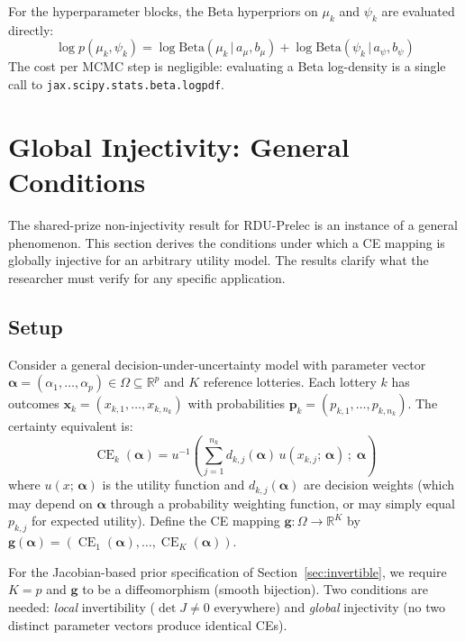 \documentclass[11pt,a4paper]{article}
\theoremstyle{definition}
\newcommand{\given}{\,|\,}
\DeclareMathOperator{\CE}{CE}
\begin{document}
For the hyperparameter blocks, the Beta hyperpriors on $\mu_k$ and $\psi_k$
are evaluated directly:
\begin{equation}
    \log p(\mu_k, \psi_k) = \log \mathrm{Beta}(\mu_k \given a_\mu, b_\mu)
    + \log \mathrm{Beta}(\psi_k \given a_\psi, b_\psi)
\end{equation}
The cost per MCMC step is negligible: evaluating a Beta log-density is a single
call to \texttt{jax.scipy.stats.beta.logpdf}.


\section{Global Injectivity: General Conditions}
\label{sec:general_injectivity}

The shared-prize non-injectivity result for RDU-Prelec is an instance of a
general phenomenon. This section derives the conditions under which a CE
mapping is globally injective for an arbitrary utility model. The results
clarify what the researcher must verify for any specific application.

\subsection{Setup}

Consider a general decision-under-uncertainty model with parameter vector
$\bm{\alpha} = (\alpha_1, \ldots, \alpha_p) \in \Omega \subseteq \mathbb{R}^p$
and $K$ reference lotteries. Each lottery $k$ has outcomes
$\mathbf{x}_k = (x_{k,1}, \ldots, x_{k,n_k})$ with probabilities
$\mathbf{p}_k = (p_{k,1}, \ldots, p_{k,n_k})$. The certainty equivalent is:
\begin{equation}
    \label{eq:general_ce}
    \CE_k(\bm{\alpha}) = u^{-1}\!\left(
    \sum_{j=1}^{n_k} d_{k,j}(\bm{\alpha}) \, u(x_{k,j};\, \bm{\alpha})
    \,;\; \bm{\alpha}\right)
\end{equation}
where $u(x;\, \bm{\alpha})$ is the utility function and
$d_{k,j}(\bm{\alpha})$ are decision weights (which may depend on
$\bm{\alpha}$ through a probability weighting function, or may simply equal
$p_{k,j}$ for expected utility). Define the CE mapping
$\mathbf{g}: \Omega \to \mathbb{R}^K$ by
$\mathbf{g}(\bm{\alpha}) = (\CE_1(\bm{\alpha}), \ldots, \CE_K(\bm{\alpha}))$.

For the Jacobian-based prior specification of Section~\ref{sec:invertible}, we
require $K = p$ and $\mathbf{g}$ to be a diffeomorphism (smooth bijection).
Two conditions are needed: \emph{local} invertibility ($\det J \neq 0$
everywhere) and \emph{global} injectivity (no two distinct parameter vectors
produce identical CEs).
\end{document}
